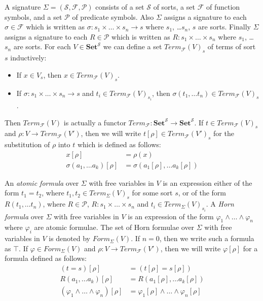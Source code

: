 \documentclass[reqno]{amsart}
\theoremstyle{definition}
\theoremstyle{remark}
\newcommand{\cat}[1]{\mathbf{#1}}
\newcommand{\Set}{\cat{Set}}
\numberwithin{figure}{section}
\begin{document}
A signature $\Sigma = (\mathcal{S}, \mathcal{F}, \mathcal{P})$ consists of a set $\mathcal{S}$ of sorts, a set $\mathcal{F}$ of function symbols, and a set $\mathcal{P}$ of predicate symbols.
Also $\Sigma$ assigns a signature to each $\sigma \in \mathcal{F}$ which is written as $\sigma : s_1 \times \ldots \times s_n \to s$ where $s_1$, \ldots $s_n$, $s$ are sorts.
Finally $\Sigma$ assigns a signature to each $R \in \mathcal{P}$ which is written as $R : s_1 \times \ldots \times s_n$ where $s_1$, \ldots $s_n$ are sorts.
For each $V \in \Set^\mathcal{S}$ we can define a set $Term_\mathcal{F}(V)_s$ of terms of sort $s$ inductively:
\begin{itemize}
\item If $x \in V_s$, then $x \in Term_\mathcal{F}(V)_s$.
\item If $\sigma : s_1 \times \ldots \times s_n \to s$ and $t_i \in Term_\mathcal{F}(V)_{s_i}$, then $\sigma(t_1, \ldots t_n) \in Term_\mathcal{F}(V)_s$.
\end{itemize}
Then $Term_\mathcal{F}(V)$ is actually a functor $Term_\mathcal{F} : \Set^\mathcal{S} \to \Set^\mathcal{S}$.
If $t \in Term_\mathcal{F}(V)_s$ and $\rho : V \to Term_\mathcal{F}(V')$, then we will write $t[\rho] \in Term_\mathcal{F}(V')_s$
for the substitution of $\rho$ into $t$ which is defined as follows:
\begin{align*}
x[\rho] & = \rho(x) \\
\sigma(a_1, \ldots a_k)[\rho] & = \sigma(a_1[\rho], \ldots a_k[\rho])
\end{align*}

An \emph{atomic formula} over $\Sigma$ with free variables in $V$ is an expression either of the form $t_1 = t_2$, where $t_1, t_2 \in Term_\Sigma(V)_s$ for some sort $s$,
    or of the form $R(t_1, \ldots t_n)$, where $R \in \mathcal{P}$, $R : s_1 \times \ldots \times s_n$ and $t_i \in Term_\Sigma(V)_{s_i}$.
A \emph{Horn formula} over $\Sigma$ with free variables in $V$ is an expression of the form $\varphi_1 \land \ldots \land \varphi_n$ where $\varphi_i$ are atomic formulae.
The set of Horn formulae over $\Sigma$ with free variables in $V$ is denoted by $Form_\Sigma(V)$.
If $n = 0$, then we write such a formula as $\top$.
If $\varphi \in Form_\Sigma(V)$ and $\rho : V \to Term_\mathcal{F}(V')$, then we will write $\varphi[\rho]$ for a formula defined as follows:
\begin{align*}
(t = s)[\rho] & = (t[\rho] = s[\rho]) \\
R(a_1, \ldots a_k)[\rho] & = R(a_1[\rho], \ldots a_k[\rho]) \\
(\varphi_1 \land \ldots \land \varphi_n)[\rho] & = \varphi_1[\rho] \land \ldots \land \varphi_n[\rho]
\end{align*}
\end{document}
